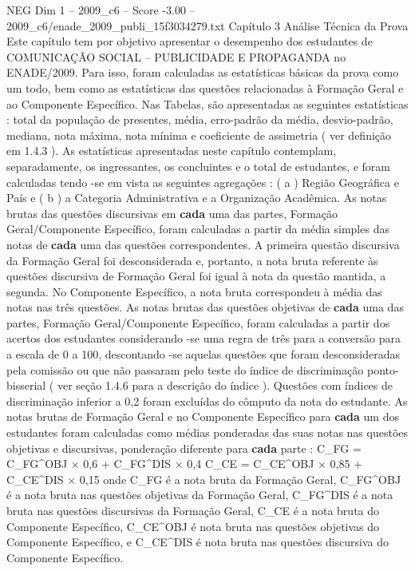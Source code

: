\begin{textsample}{NEG Dim 1 – 2009\_c6 – Score -3.00 – 2009\_c6/enade\_2009\_publi\_15f3034279.txt}  \label{ex:f1_neg_216}
Capítulo 3 Análise Técnica da Prova Este capítulo tem por objetivo apresentar o desempenho dos estudantes de COMUNICAÇÃO SOCIAL – PUBLICIDADE E PROPAGANDA no ENADE/2009.
Para isso, foram calculadas as estatísticas básicas da prova como um todo, bem como as estatísticas das questões relacionadas à Formação Geral e ao Componente Específico.
Nas Tabelas, são apresentadas as seguintes estatísticas : total da população de presentes, média, erro-padrão da média, desvio-padrão, mediana, nota máxima, nota mínima e coeficiente de assimetria ( ver definição em 1.4.3 ).
As estatísticas apresentadas neste capítulo contemplam, separadamente, os ingressantes, os concluintes e o total de estudantes, e foram calculadas tendo -se em vista as seguintes agregações : ( a ) Região Geográfica e País e ( b ) a Categoria Administrativa e a Organização Acadêmica.
As notas brutas das questões discursivas em \textbf{cada} uma das partes, Formação Geral/Componente Específico, foram calculadas a partir da média simples das notas de \textbf{cada} uma das questões correspondentes.
A primeira questão discursiva da Formação Geral foi desconsiderada e, portanto, a nota bruta referente às questões discursiva de Formação Geral foi igual à nota da questão mantida, a segunda.
No Componente Específico, a nota bruta correspondeu à média das notas nas três questões.
As notas brutas das questões objetivas de \textbf{cada} uma das partes, Formação Geral/Componente Específico, foram calculadas a partir dos acertos dos estudantes considerando -se uma regra de três para a conversão para a escala de 0 a 100, descontando -se aquelas questões que foram desconsideradas pela comissão ou que não passaram pelo teste do índice de discriminação ponto-bisserial ( ver seção 1.4.6 para a descrição do índice ).
Questões com índices de discriminação inferior a 0,2 foram excluídas do cômputo da nota do estudante.
As notas brutas de Formação Geral e no Componente Específico para \textbf{cada} um dos estudantes foram calculadas como médias ponderadas das suas notas nas questões objetivas e discursivas, ponderação diferente para \textbf{cada} parte : C\_FG = C\_FG\textasciicircum{}OBJ × 0,6 + C\_FG\textasciicircum{}DIS × 0,4 C\_CE = C\_CE\textasciicircum{}OBJ × 0,85 + C\_CE\textasciicircum{}DIS × 0,15 onde C\_FG é a nota bruta da Formação Geral, C\_FG\textasciicircum{}OBJ é a nota bruta nas questões objetivas da Formação Geral, C\_FG\textasciicircum{}DIS é a nota bruta nas questões discursivas da Formação Geral, C\_CE é a nota bruta do Componente Específico, C\_CE\textasciicircum{}OBJ é nota bruta nas questões objetivas do Componente Específico, e C\_CE\textasciicircum{}DIS é nota bruta nas questões discursiva do Componente Específico.

\end{textsample}
